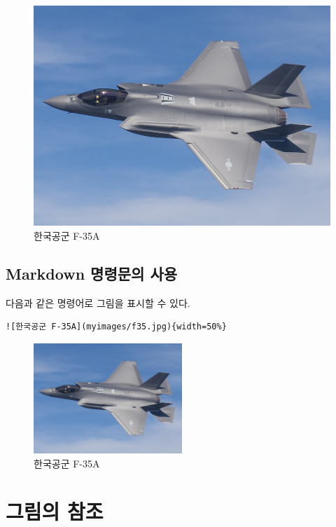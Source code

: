 \documentclass[
]{book}
\theoremstyle{definition}
\theoremstyle{definition}
\theoremstyle{definition}
\theoremstyle{definition}
\theoremstyle{remark}
\begin{document}
\begin{figure}

{\centering \includegraphics[width=0.8\linewidth]{myimages/f35} 

}

\caption{한국공군 F-35A}\label{fig:f35a}
\end{figure}

\hypertarget{markdown-uxba85uxb839uxbb38uxc758-uxc0acuxc6a9}{%
\subsection{Markdown 명령문의 사용}\label{markdown-uxba85uxb839uxbb38uxc758-uxc0acuxc6a9}}

다음과 같은 명령어로 그림을 표시할 수 있다.

\begin{verbatim}
![한국공군 F-35A](myimages/f35.jpg){width=50%}
\end{verbatim}

\begin{figure}
\centering
\includegraphics[width=0.5\textwidth,height=\textheight]{myimages/f35.jpg}
\caption{한국공군 F-35A}
\end{figure}

\hypertarget{uxadf8uxb9bcuxc758-uxcc38uxc870}{%
\section{그림의 참조}\label{uxadf8uxb9bcuxc758-uxcc38uxc870}}
\end{document}
